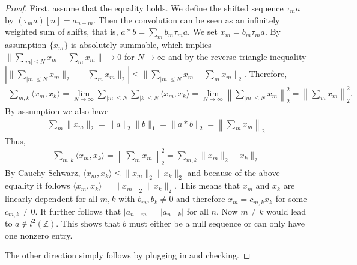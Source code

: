 \begin{proof}
    First, assume that the equality holds. We define the shifted sequence $\tau_ma$ by $(\tau_ma)[n]=a_{n-m}$. Then the convolution can be seen as an infinitely weighted sum of shifts, that is, $a\ast b=\sum_mb_m\tau_ma$. We set $x_m=b_m\tau_ma$. By assumption $\{x_m\}$ is absolutely summable, which implies $\|\sum_{|m|\le N}x_m-\sum_mx_m\|\to0$ for $N\to\infty$ and by the reverse triangle inequality $|\|\sum_{|m|\le N}x_m\|_2-\|\sum_mx_m\|_2|\le\|\sum_{|m|\le N}x_m-\sum_mx_m\|_2$. Therefore,
    \begin{align*}
        \sum_{m,k}\langle x_m,x_k\rangle=\lim_{N\to\infty}\sum_{|m|\le N}\sum_{|k|\le N}\langle x_m,x_k\rangle=\lim_{N\to\infty}\left\|\sum_{|m|\le N}x_m\right\|_2^2=\left\|\sum_mx_m\right\|_2^2.
    \end{align*}
    By assumption we also have
    \begin{align*}
        \sum_m\|x_m\|_2=\|a\|_2\|b\|_1=\|a\ast b\|_2=\left\|\sum_mx_m\right\|_2
    \end{align*}
    Thus,
    \begin{align*}
        \sum_{m,k}\langle x_m,x_k\rangle=\left\|\sum_{m}x_m\right\|_2^2=\sum_{m,k}\|x_m\|_2\|x_k\|_2
    \end{align*}
    By Cauchy Schwarz, $\langle x_m,x_k\rangle\le\|x_m\|_2\|x_k\|_2$ and because of the above equality it follows $\langle x_m,x_k\rangle=\|x_m\|_2\|x_k\|_2$. This means that $x_m$ and $x_k$ are linearly dependent for all $m,k$ with $b_m,b_k\ne0$ and therefore $x_m=c_{m,k}x_k$ for some $c_{m,k}\ne0$. It further follows that $|a_{n-m}|=|a_{n-k}|$ for all $n$. Now $m\ne k$ would lead to $a\notin l^{2}(\mathbb{Z})$. This shows that $b$ must either be a null sequence or can only have one nonzero entry.

    The other direction simply follows by plugging in and checking.
\end{proof}

